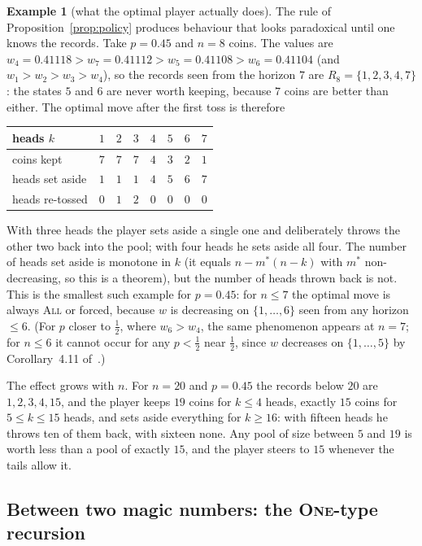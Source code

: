 \documentclass[11pt]{article}
\theoremstyle{definition}
\newtheorem{example}[theorem]{Example}
\newcommand{\One}{\textsc{One}}
\newcommand{\All}{\textsc{All}}
\begin{document}
\begin{example}[what the optimal player actually does]\label{ex:policy}
  The rule of Proposition~\ref{prop:policy} produces behaviour that
  looks paradoxical until one knows the records.  Take $p=0.45$ and
  $n=8$ coins.  The values are $w_4=0.41118>w_7=0.41112>w_5=0.41108>
  w_6=0.41104$ (and $w_1>w_2>w_3>w_4$), so the records seen from the
  horizon $7$ are $R_8=\{1,2,3,4,7\}$: the states $5$ and $6$ are
  never worth keeping, because $7$ coins are better than either.  The
  optimal move after the first toss is therefore
  \begin{center}
  \begin{tabular}{@{}lccccccc@{}}
  \toprule
  heads $k$ & $1$ & $2$ & $3$ & $4$ & $5$ & $6$ & $7$ \\
  \midrule
  coins kept & $7$ & $7$ & $7$ & $4$ & $3$ & $2$ & $1$ \\
  heads set aside & $1$ & $1$ & $1$ & $4$ & $5$ & $6$ & $7$ \\
  heads re-tossed & $0$ & $1$ & $2$ & $0$ & $0$ & $0$ & $0$ \\
  \bottomrule
  \end{tabular}
  \end{center}
  With three heads the player sets aside a single one and deliberately
  throws the other two back into the pool; with four heads he sets
  aside all four.  The number of heads set aside is monotone in $k$
  (it equals $n-m^*(n-k)$ with $m^*$ non-decreasing, so this is a
  theorem), but the number of heads thrown back is not.  This is the
  smallest such example for $p=0.45$: for $n\le7$ the optimal move is
  always \All{} or forced, because $w$ is decreasing on $\{1,\dots,6\}$
  seen from any horizon $\le6$.  (For $p$ closer to $\tfrac12$, where
  $w_6>w_4$, the same phenomenon appears at $n=7$; for $n\le6$ it cannot
  occur for any $p<\tfrac12$ near $\tfrac12$, since $w$ decreases on
  $\{1,\dots,5\}$ by Corollary~4.11 of~\cite{Paper1}.)

  The effect grows with $n$.  For $n=20$ and $p=0.45$ the records
  below $20$ are $1,2,3,4,15$, and the player keeps $19$ coins for
  $k\le4$ heads, exactly $15$ coins for $5\le k\le15$ heads, and sets
  aside everything for $k\ge16$: with fifteen heads he throws ten of
  them back, with sixteen none.  Any pool of size between $5$ and $19$
  is worth less than a pool of exactly $15$, and the player steers to
  $15$ whenever the tails allow it.
\end{example}

\subsection{Between two magic numbers: the \One{}-type recursion}
\end{document}

